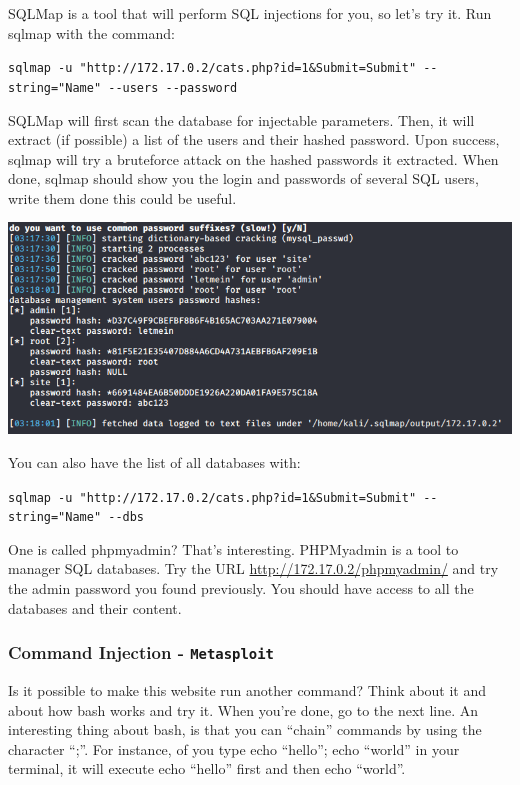 \documentclass{article}
\begin{document}
\noindent SQLMap is a tool that will perform SQL injections for you, so let’s try it. Run sqlmap with the command:
\begin{center}
    \lstinline{sqlmap -u "http://172.17.0.2/cats.php?id=1&Submit=Submit" --string="Name" --users --password}
\end{center}
SQLMap will first scan the database for injectable parameters. Then, it will extract (if
possible) a list of the users and their hashed password. Upon success, sqlmap will try a bruteforce attack on the hashed passwords it extracted. When done, sqlmap should show you the login and passwords of several SQL users,
write them done this could be useful.

\begin{center}
    \includegraphics[scale=0.5]{imageTP/5.PNG}
\end{center}

\noindent You can also have the list of all databases with:
\begin{center}
    \lstinline{sqlmap -u "http://172.17.0.2/cats.php?id=1&Submit=Submit" --string="Name" --dbs}
\end{center}
One is called phpmyadmin? That’s interesting. PHPMyadmin is a tool to manager SQL databases. Try the URL \url{http://172.17.0.2/phpmyadmin/} and try the admin password you found previously. You should have access to all the databases and their content.



\subsubsection{Command Injection - \lstinline{Metasploit}}
Is it possible to make this website run another command? Think about it and about how bash works and try it. When you’re done, go to the next line. An interesting thing about bash, is that you can “chain” commands by using the character “;”. For instance, of you type echo “hello”; echo “world” in your terminal, it will execute echo “hello” first and then echo “world”.\\ 
\end{document}
